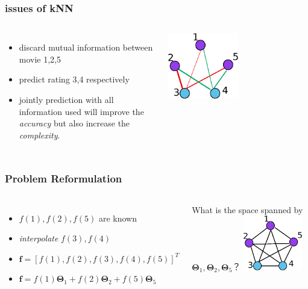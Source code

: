 \documentclass{beamer}
\begin{document}
\begin{frame}
\frametitle{issues of kNN}
\begin{columns}
\begin{itemize}
\item discard mutual information between movie 1,2,5
\item predict rating 3,4 respectively
\item jointly prediction with all information used will improve the \textit{accuracy} but also increase the \textit{complexity}.
\end{itemize}
\includegraphics[width=0.5\textwidth]{movie5_knn_issues.eps}
\end{columns}
\end{frame}

\begin{frame}
\frametitle{Problem Reformulation}
\begin{columns}
\begin{itemize}
\item $f(1),f(2),f(5)$ are known
\item \textit{interpolate} $f(3),f(4)$
\item $\bm{f}=[f(1),f(2),f(3),f(4),f(5)]^T$
\item $\bm{f}=f(1)\bm{\Theta}_1 + f(2)\bm{\Theta}_2 + f(5)\bm{\Theta}_5$
\end{itemize}
What is the space spanned by $\bm{\Theta}_1,\bm{\Theta}_2,\bm{\Theta}_5$？
\includegraphics[width=0.5\textwidth]{movie5.eps}
\end{columns}
\end{frame}
\end{document}
